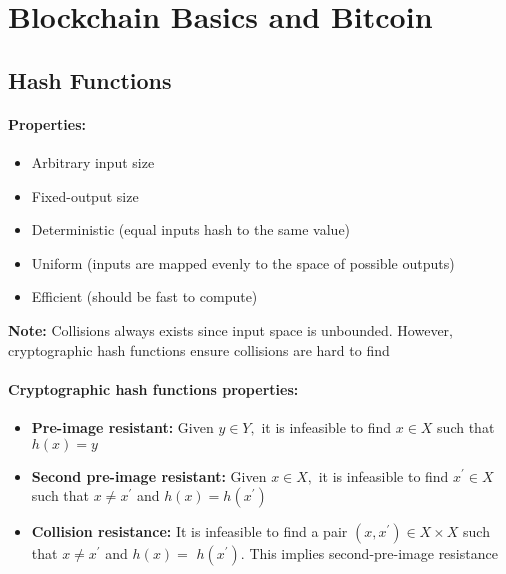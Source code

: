 \section{Blockchain Basics and Bitcoin}
\subsection{Hash Functions}
\paragraph{Properties:}
\begin{itemize}
    \item Arbitrary input size
    \item Fixed-output size
    \item Deterministic (equal inputs hash to the same value)
    \item Uniform (inputs are mapped evenly to the space of possible outputs)
    \item Efficient (should be fast to compute)
\end{itemize}
\textbf{Note:} Collisions always exists since input space is unbounded. However, cryptographic hash functions ensure collisions are hard to find
\paragraph{Cryptographic hash functions properties:}
\begin{itemize}
    \item \textbf{Pre-image resistant: }Given $y \in Y,$ it is infeasible to find $x \in X$ such that $h(x)=y$
    \item \textbf{Second pre-image resistant: }Given $x \in X,$ it is infeasible to find $x^{\prime} \in X$ such that $x \neq x^{\prime}$ and $h(x)=h\left(x^{\prime}\right)$
    \item \textbf{Collision resistance: }It is infeasible to find a pair $\left(x, x^{\prime}\right) \in X \times X$ such that $x \neq x^{\prime}$ and $h(x)=$ $h\left(x^{\prime}\right)$. This implies second-pre-image resistance
\end{itemize}
